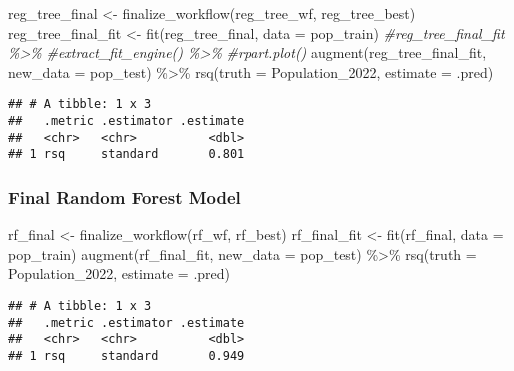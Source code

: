 \documentclass[
]{article}
\newenvironment{Shaded}{\begin{snugshade}}{\end{snugshade}}
\newcommand{\AttributeTok}[1]{\textcolor[rgb]{0.77,0.63,0.00}{#1}}
\newcommand{\CommentTok}[1]{\textcolor[rgb]{0.56,0.35,0.01}{\textit{#1}}}
\newcommand{\FunctionTok}[1]{\textcolor[rgb]{0.00,0.00,0.00}{#1}}
\newcommand{\NormalTok}[1]{#1}
\newcommand{\OtherTok}[1]{\textcolor[rgb]{0.56,0.35,0.01}{#1}}
\newcommand{\SpecialCharTok}[1]{\textcolor[rgb]{0.00,0.00,0.00}{#1}}
\begin{document}
\begin{Shaded}
\begin{Highlighting}[]
\NormalTok{reg\_tree\_final }\OtherTok{\textless{}{-}} \FunctionTok{finalize\_workflow}\NormalTok{(reg\_tree\_wf, reg\_tree\_best)}
\NormalTok{reg\_tree\_final\_fit }\OtherTok{\textless{}{-}} \FunctionTok{fit}\NormalTok{(reg\_tree\_final, }\AttributeTok{data =}\NormalTok{ pop\_train)}
\CommentTok{\#reg\_tree\_final\_fit \%\textgreater{}\%}
  \CommentTok{\#extract\_fit\_engine() \%\textgreater{}\%}
  \CommentTok{\#rpart.plot()}
\FunctionTok{augment}\NormalTok{(reg\_tree\_final\_fit, }\AttributeTok{new\_data =}\NormalTok{ pop\_test) }\SpecialCharTok{\%\textgreater{}\%}
  \FunctionTok{rsq}\NormalTok{(}\AttributeTok{truth =}\NormalTok{ Population\_2022, }\AttributeTok{estimate =}\NormalTok{ .pred)}
\end{Highlighting}
\end{Shaded}

\begin{verbatim}
## # A tibble: 1 x 3
##   .metric .estimator .estimate
##   <chr>   <chr>          <dbl>
## 1 rsq     standard       0.801
\end{verbatim}

\hypertarget{final-random-forest-model}{%
\subsubsection{Final Random Forest
Model}\label{final-random-forest-model}}

\begin{Shaded}
\begin{Highlighting}[]
\NormalTok{rf\_final }\OtherTok{\textless{}{-}} \FunctionTok{finalize\_workflow}\NormalTok{(rf\_wf, rf\_best)}
\NormalTok{rf\_final\_fit }\OtherTok{\textless{}{-}} \FunctionTok{fit}\NormalTok{(rf\_final, }\AttributeTok{data =}\NormalTok{ pop\_train)}
\FunctionTok{augment}\NormalTok{(rf\_final\_fit, }\AttributeTok{new\_data =}\NormalTok{ pop\_test) }\SpecialCharTok{\%\textgreater{}\%}
  \FunctionTok{rsq}\NormalTok{(}\AttributeTok{truth =}\NormalTok{ Population\_2022, }\AttributeTok{estimate =}\NormalTok{ .pred)}
\end{Highlighting}
\end{Shaded}

\begin{verbatim}
## # A tibble: 1 x 3
##   .metric .estimator .estimate
##   <chr>   <chr>          <dbl>
## 1 rsq     standard       0.949
\end{verbatim}
\end{document}

